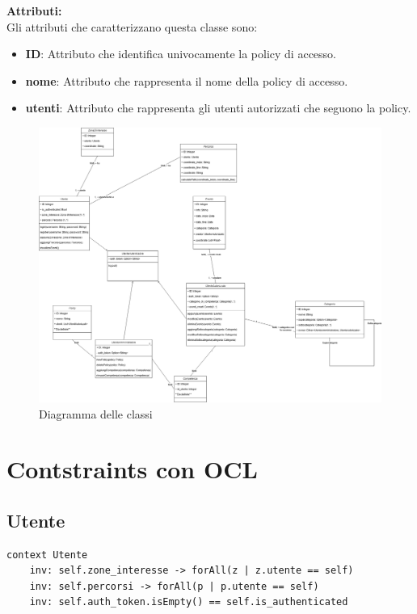 \documentclass{article}
\begin{document}
\textbf{Attributi:}\\
Gli attributi che caratterizzano questa classe sono:
\begin{itemize}
    \item \textbf{ID}: Attributo che identifica univocamente la policy di accesso.
    \item \textbf{nome}: Attributo che rappresenta il nome della policy di accesso.
    \item \textbf{utenti}: Attributo che rappresenta gli utenti autorizzati che seguono la policy.
\end{itemize}

\clearpage

\begin{figure}[htbp]
    \centering
    \includegraphics[width=1\textwidth]{Images/class_diagram.png}
    \caption{Diagramma delle classi}
    \label{fig:class-diagram}
\end{figure}

\clearpage

\section{Contstraints con OCL}

\subsection{Utente}

\begin{verbatim}
context Utente
    inv: self.zone_interesse -> forAll(z | z.utente == self)
    inv: self.percorsi -> forAll(p | p.utente == self)
    inv: self.auth_token.isEmpty() == self.is_authenticated
\end{verbatim}
\end{document}
